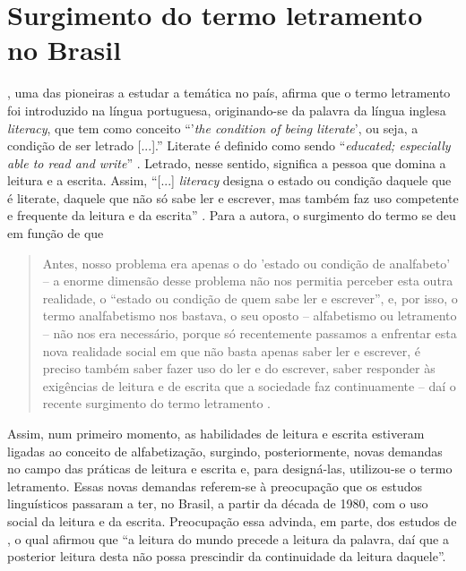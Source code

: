 \documentclass{textolivre}
\begin{document}
\section{Surgimento do termo letramento no Brasil}\label{sec-surgimento}
\textcite[p. 35]{soares2004}, uma das pioneiras a estudar
a temática no país, afirma que o termo letramento foi introduzido na língua
portuguesa, originando-se da palavra da língua inglesa \textit{literacy}, que tem como
conceito “’\textit{the condition of being literate}’, ou seja, a condição de ser letrado
[...].” Literate é definido como sendo “\textit{educated; especially able to read and
write}” \cite[p. 35]{soares2004}. Letrado, nesse sentido, significa a pessoa que
domina a leitura e a escrita. Assim, “[...] \textit{literacy} designa o estado ou
condição daquele que é literate, daquele que não só sabe ler e escrever, mas
também faz uso competente e frequente da leitura e da escrita” \textcite[p. 36]{soares2004}.
Para a autora, o surgimento do termo se deu em função de que
\begin{quote}
Antes, nosso problema era apenas o do 'estado ou condição de analfabeto' – a
enorme dimensão desse problema não nos permitia perceber esta outra realidade,
o “estado ou condição de quem sabe ler e escrever”, e, por isso, o termo
analfabetismo nos bastava, o seu oposto – alfabetismo ou letramento – não nos
era necessário, porque só recentemente passamos a enfrentar esta nova realidade
social em que não basta apenas saber ler e escrever, é preciso também saber
fazer uso do ler e do escrever, saber responder às exigências de leitura e de
escrita que a sociedade faz continuamente – daí o recente surgimento do termo
letramento \cite[p. 20]{soares2004}.
\end{quote}

Assim, num primeiro momento, as habilidades de leitura e escrita estiveram
ligadas ao conceito de alfabetização, surgindo, posteriormente, novas demandas
no campo das práticas de leitura e escrita e, para designá-las, utilizou-se o
termo letramento. Essas novas demandas referem-se à preocupação que os estudos
linguísticos passaram a ter, no Brasil, a partir da década de 1980, com o uso
social da leitura e da escrita. Preocupação essa advinda, em parte, dos estudos
de \textcite[p. 9]{freire1989}, o qual afirmou que “a leitura do mundo precede a
leitura da palavra, daí que a posterior leitura desta não possa prescindir da
continuidade da leitura daquele”.
\end{document}
